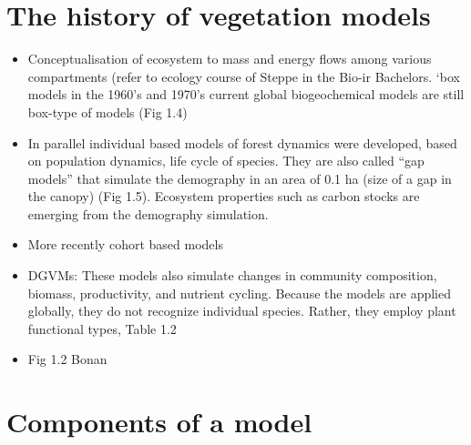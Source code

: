 \documentclass[
  oneside]{book}
\providecommand{\tightlist}{%
  \setlength{\itemsep}{0pt}\setlength{\parskip}{0pt}}
\begin{document}
\hypertarget{the-history-of-vegetation-models}{%
\section{The history of vegetation models}\label{the-history-of-vegetation-models}}

\begin{itemize}
\tightlist
\item
  Conceptualisation of ecosystem to mass and energy flows among various compartments (refer to ecology course of Steppe in the Bio-ir Bachelors. `box models in the 1960's and 1970's current global biogeochemical models are still box-type of models (Fig 1.4)
\item
  In parallel individual based models of forest dynamics were developed, based on population dynamics, life cycle of species. They are also called ``gap models'' that simulate the demography in an area of 0.1 ha (size of a gap in the canopy) (Fig 1.5). Ecosystem properties such as carbon stocks are emerging from the demography simulation.
\item
  More recently cohort based models
\item
  DGVMs: These models also simulate changes in community composition, biomass, productivity, and nutrient cycling. Because the models are applied globally, they do not recognize individual species. Rather, they employ plant functional types, Table 1.2
\item
  Fig 1.2 Bonan
\end{itemize}

\hypertarget{components-of-a-model}{%
\section{Components of a model}\label{components-of-a-model}}
\end{document}
